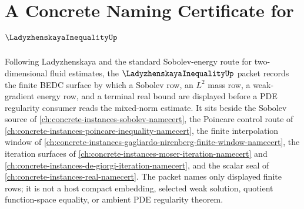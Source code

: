 \chapter{A Concrete Naming Certificate for $\LadyzhenskayaInequalityUp$}
\label{ch:concrete-instances-ladyzhenskaya-inequality-namecert}

Following Ladyzhenskaya and the standard Sobolev-energy route for two-dimensional fluid estimates, the $\LadyzhenskayaInequalityUp$ packet records the finite BEDC surface by which a Sobolev row, an $L^2$ mass row, a weak-gradient energy row, and a terminal real bound are displayed before a PDE regularity consumer reads the mixed-norm estimate. It sits beside the Sobolev source of \autoref{ch:concrete-instances-sobolev-namecert}, the Poincare control route of \autoref{ch:concrete-instances-poincare-inequality-namecert}, the finite interpolation window of \autoref{ch:concrete-instances-gagliardo-nirenberg-finite-window-namecert}, the iteration surfaces of \autoref{ch:concrete-instances-moser-iteration-namecert} and \autoref{ch:concrete-instances-de-giorgi-iteration-namecert}, and the scalar seal of \autoref{ch:concrete-instances-real-namecert}. The packet names only displayed finite rows; it is not a host compact embedding, selected weak solution, quotient function-space equality, or ambient PDE regularity theorem.

